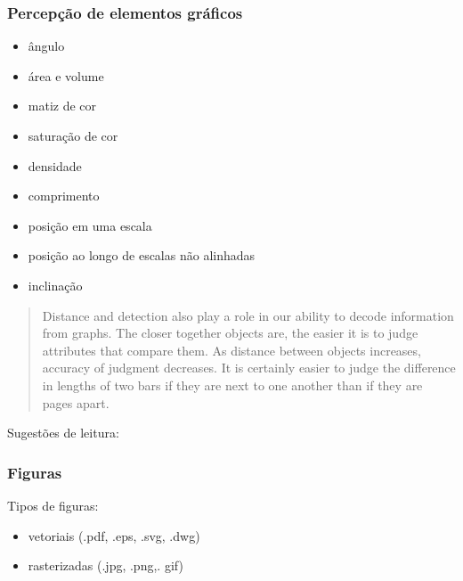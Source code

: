 \begin{frame}[allowframebreaks]
\frametitle{Percepção de elementos gráficos}
\begin{itemize}
\item ângulo  
\item área e volume 
\item matiz de cor
\item saturação de cor
\item densidade
\item comprimento
\item posição em uma escala
\item posição ao longo de escalas não alinhadas
\item inclinação
\end{itemize}

\begin{quote}
Distance and detection also play a role in our ability to decode
information from graphs. The closer together objects are, the
easier it is to judge attributes that compare them. As distance
between objects increases, accuracy of judgment decreases. It
is certainly easier to judge the difference in lengths of two bars
if they are next to one another than if they are pages apart.
\cite{robbins_creating_2013}
\end{quote}

\end{frame}



\begin{frame}
Sugestões de leitura: 
\vspace{2ex}

\vspace{2ex}

\vspace{2ex}

\vspace{2ex}

\vspace{2ex}

\end{frame}


\begin{frame}
\frametitle{Figuras}
Tipos de figuras:
\begin{itemize}
\item vetoriais (.pdf, .eps, .svg, .dwg)
\item rasterizadas (.jpg, .png,. gif)
\end{itemize}
\end{frame}


